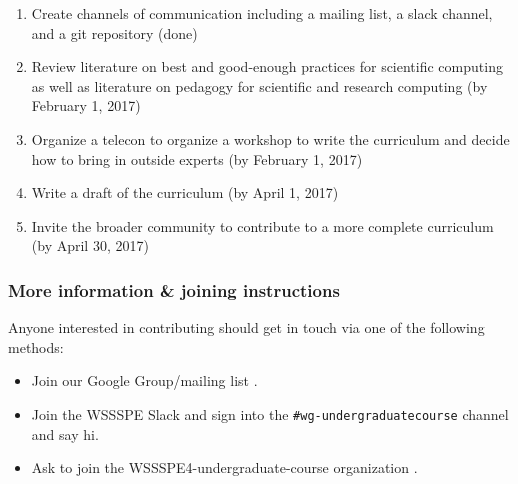 \begin{enumerate}
\item Create channels of communication including a mailing list, a
  slack channel, and a git repository (done)
\item Review literature on best and good-enough practices for
  scientific computing as well as literature on pedagogy for
  scientific and research computing (by February 1, 2017)
\item Organize a telecon to organize a workshop to write the
  curriculum and decide how to bring in outside experts (by February 1,
  2017)
\item Write a draft of the curriculum (by April 1, 2017)
\item Invite the broader community to contribute to a more complete
  curriculum (by April 30, 2017)
\end{enumerate}

\subsubsection{More information \& joining instructions}

Anyone interested in contributing should get in touch via one of the
following methods:

\begin{itemize}
\item Join our Google Group/mailing list
  \cite{WSSSPEUndergradGoogleGroup}.
\item Join the WSSSPE Slack \cite{WSSSPESlack} and sign into the
  \texttt{\#wg-undergraduatecourse} channel and say hi.
\item Ask to join the WSSSPE4-undergraduate-course organization
  \cite{WSSSPEUndergradGithub}.
\end{itemize}
